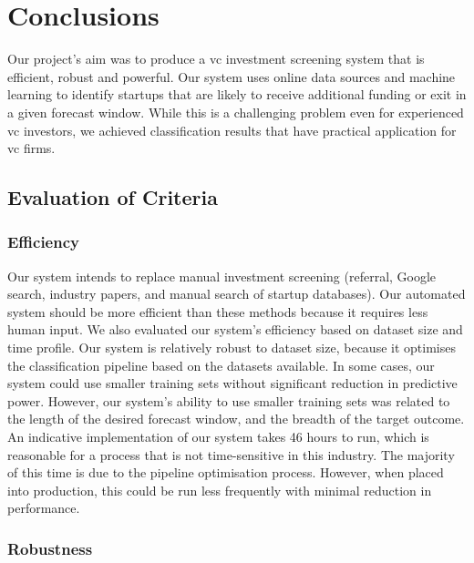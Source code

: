 \documentclass[../thesis/thesis.tex]{subfiles}
\begin{document}
 \chapter{Conclusions}
 \label{chap:conclusions}

Our project's aim was to produce a \gls{vc} investment screening system that is efficient, robust and powerful. Our system uses online data sources and machine learning to identify startups that are likely to receive additional funding or exit in a given forecast window. While this is a challenging problem even for experienced \gls{vc} investors, we achieved classification results that have practical application for \gls{vc} firms.

\section{Evaluation of Criteria}

\subsection{Efficiency}

Our system intends to replace manual investment screening (referral, Google search, industry papers, and manual search of startup databases). Our automated system should be more efficient than these methods because it requires less human input. We also evaluated our system's efficiency based on dataset size and time profile. Our system is relatively robust to dataset size, because it optimises the classification pipeline based on the datasets available. In some cases, our system could use smaller training sets without significant reduction in predictive power. However, our system's ability to use smaller training sets was related to the length of the desired forecast window, and the breadth of the target outcome. An indicative implementation of our system takes 46 hours to run, which is reasonable for a process that is not time-sensitive in this industry. The majority of this time is due to the pipeline optimisation process. However, when placed into production, this could be run less frequently with minimal reduction in performance.

\subsection{Robustness}
\end{document}
